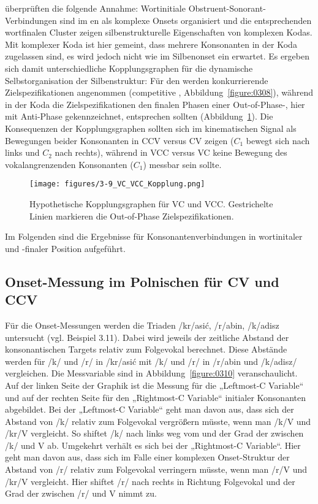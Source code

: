 {\citet{Mücke2010b} überprüften die folgende Annahme: Wortinitiale Obstruent-Sonorant-Verbindungen sind im en als komplexe Onsets organisiert und die entsprechenden wortfinalen Cluster zeigen silbenstrukturelle Eigenschaften von komplexen Kodas. Mit komplexer Koda ist hier gemeint, dass mehrere Konsonanten in der Koda zugelassen sind, es wird jedoch nicht wie im Silbenonset ein  erwartet. Es ergeben sich damit unterschiedliche Kopplungsgraphen für die dynamische Selbstorganisation der Silbenstruktur: Für den  werden konkurrierende Zielspezifikationen angenommen (competitive , Abbildung~\ref{figure:0308}), während in der Koda die Zielspezifikationen den finalen Phasen einer Out-of-Phase-, hier mit Anti-Phase gekennzeichnet, entsprechen sollten (Abbildung~\ref{figure:0309}). Die Konsequenzen der Kopplungsgraphen sollten sich im kinematischen Signal als Bewegungen beider Konsonanten in CCV versus CV zeigen (${C}_{1}$ bewegt sich nach links und ${C}_{2}$ nach rechts), während in VCC versus VC keine Bewegung des vokalangrenzenden Konsonanten (${C}_{1}$) messbar sein sollte.

\begin{figure}
	\texttt{[image: figures/3-9\_VC\_VCC\_Kopplung.png]}
	\caption{Hypothetische Kopplungsgraphen für VC und VCC. Gestrichelte Linien markieren die Out-of-Phase Zielspezifikationen.}
	\label{figure:0309}
\end{figure}

Im Folgenden sind die Ergebnisse für Konsonantenverbindungen in wortinitaler und -finaler Position aufgeführt.


\subsection{Onset-Messung im  {Polnisch}en für CV und CCV}
\label{subsec:030401}

Für die Onset-Messungen werden die Triaden /kr/asić, /r/abin, /k/adisz untersucht (vgl. Beispiel 3.11). Dabei wird jeweils der zeitliche Abstand der konsonantischen Targets relativ zum Folgevokal berechnet. Diese Abstände werden für /k/ und /r/ in /kr/asić mit /k/ und /r/ in /r/abin und /k/adisz/ vergleichen. Die Messvariable sind in Abbildung~\ref{figure:0310} veranschaulicht. Auf der linken Seite der Graphik ist die Messung für die „Leftmost-C Variable“ und auf der rechten Seite für den „Rightmost-C Variable“ initialer Konsonanten abgebildet. Bei der „Leftmost-C Variable“ geht man davon aus, dass sich der Abstand von /k/ relativ zum Folgevokal vergrößern müsste, wenn man /k/V und /kr/V vergleicht. So shiftet /k/ nach links weg vom  und der Grad der  zwischen /k/ und V ab. Umgekehrt verhält es sich bei der „Rightmost-C Variable“. Hier geht man davon aus, dass sich im Falle einer komplexen Onset-Struktur der Abstand von /r/ relativ zum Folgevokal verringern müsste, wenn man /r/V und /kr/V vergleicht. Hier shiftet /r/ nach rechts in Richtung Folgevokal und der Grad der  zwischen /r/ und V nimmt zu.

}
